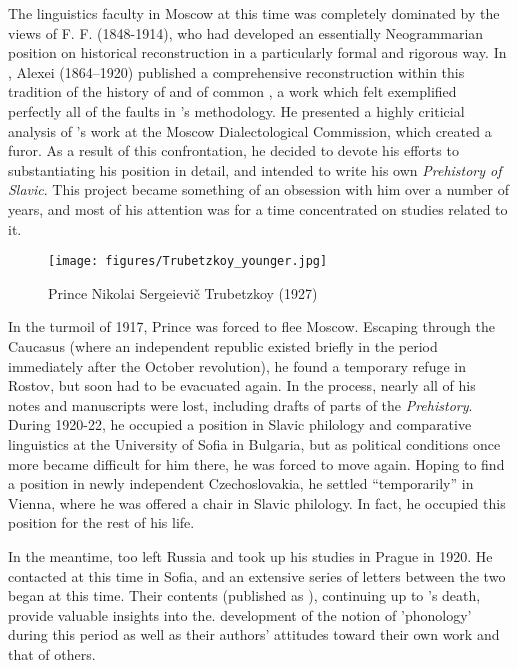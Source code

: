 The linguistics faculty in Moscow at this time was completely
dominated by the views of F. F. {\Fortunatov} (1848-1914), who had
developed an essentially Neo\-grammarian position on historical
reconstruction in a particularly formal and rigorous way. In
\citeyear{shakhmatov15:common.slavic}, Alexei {} (1864--1920)
published a comprehensive reconstruction within this tradition of the
history of  and of common , a work which {\Trubetzkoy} felt
exemplified perfectly all of the faults in {\Fortunatov}'s
methodology. He presented a highly criticial analysis of {}'s
work at the Moscow Dialectological Commission, which created a
furor. As a result of this confrontation, he decided to devote his
efforts to substantiating his position in detail, and intended to
write his own \textsl{Prehistory of Slavic}. This project became
something of an obsession with him over a number of years, and most of
his attention was for a time concentrated on studies related to it.

\begin{wrapfigure}[17]{r}{.35\textwidth}
  \texttt{[image: figures/Trubetzkoy\_younger.jpg]}
  \caption{Prince Nikolai Sergeievič Trubetzkoy (1927)}
  \label{fig:ch.prague_trubetzkoy_younger}
\end{wrapfigure}
In the turmoil of 1917, Prince {\Trubetzkoy} was forced to flee
Moscow. Escaping through the Caucasus (where an independent republic
existed briefly in the period immediately after the October
revolution), he found a temporary refuge in Rostov, but soon had to be
evacuated again. In the process, nearly all of his notes and
manuscripts were lost, including drafts of parts of the
\textsl{Prehistory}. During 1920-22, he occupied a position in Slavic
philology and comparative linguistics at the University of Sofia in
Bulgaria, but as political conditions once more became difficult for
him there, he was forced to move again. Hoping to find a position in
newly independent Czechoslovakia, he settled ``temporarily'' in Vienna,
where he was offered a chair in Slavic philology. In fact, he occupied
this position for the rest of his life.

In the meantime, {\Jakobson} too left Russia and took up his studies in
Prague in 1920. He contacted {\Trubetzkoy} at this time in Sofia, and an
extensive series of letters between the two began at this time. Their
contents (published as \citealt{jakobson75:trubetzkoy.letters}),
continuing up to {\Trubetzkoy}'s death, provide valuable insights into
the. development of the notion of 'phonology' during this period as
well as their authors' attitudes toward their own work and that of
others.

